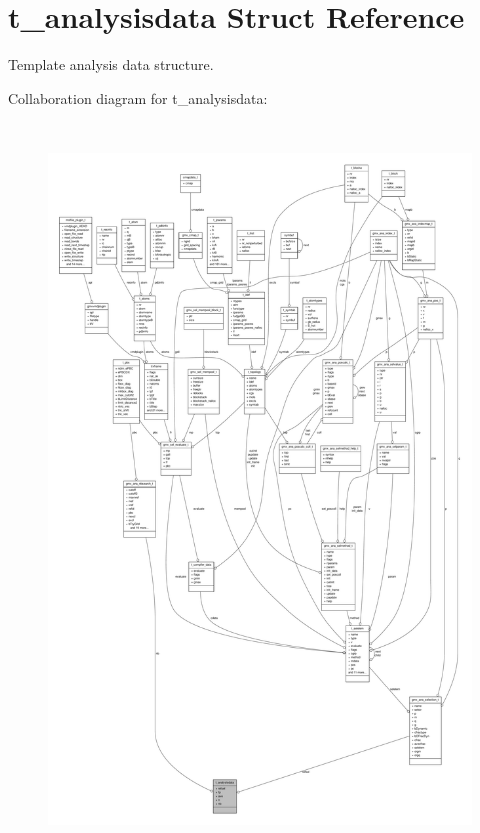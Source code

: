 \hypertarget{structt__analysisdata}{\section{t\-\_\-analysisdata \-Struct \-Reference}
\label{structt__analysisdata}
}


\-Template analysis data structure.  




\-Collaboration diagram for t\-\_\-analysisdata\-:
\nopagebreak
\begin{figure}[H]
\begin{center}
\leavevmode
\includegraphics[height=550pt]{structt__analysisdata__coll__graph}
\end{center}
\end{figure}
